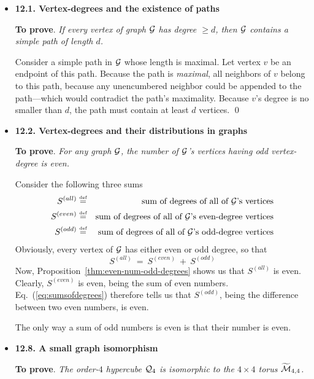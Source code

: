 \begin{itemize}
\item
{\bf 12.1. Vertex-degrees and the existence of paths}
\smallskip

{\bf To prove}. {\em If every vertex of graph $\mbox{$\cal G$}$ has degree $\geq d$, then $\mbox{$\cal G$}$ contains a {\em simple} path of length $d$.}
\smallskip

Consider a simple path in $\mbox{$\cal G$}$ whose length is maximal.  Let vertex $v$ be an endpoint of this path.  Because the path is {\em maximal}, all neighbors of $v$ belong to this path, because any unencumbered neighbor could be appended to the path---which would contradict the path's maximality.  Because $v$'s degree is no smaller than $d$, the path must contain at least $d$ vertices.  \qed

\medskip\item
{\bf 12.2. Vertex-degrees and their distributions in graphs}
\smallskip

{\bf To prove}.  {\em For any graph $\mbox{$\cal G$}$, the number of $\mbox{$\cal G$}$'s vertices having odd vertex-degree is even.}

\smallskip

Consider the following three sums
\begin{eqnarray*}
S^{(all)}     & \stackrel{\mbox{{\tiny def}}}{=} & \mbox{sum of degrees of all of $\mbox{$\cal G$}$'s vertices} \\
S^{(even)} & \stackrel{\mbox{{\tiny def}}}{=} & \mbox{sum of degrees of all of $\mbox{$\cal G$}$'s even-degree vertices} \\
S^{(odd)}  & \stackrel{\mbox{{\tiny def}}}{=} & \mbox{sum of degrees of all of $\mbox{$\cal G$}$'s odd-degree vertices}
\end{eqnarray*}
Obviously, every vertex of $\mbox{$\cal G$}$ has either even or odd degree, so that
\begin{equation}
\label{eq:sumsofdegrees}
S^{(all)} \ = \ S^{(even)} \ + \ S^{(odd)}
\end{equation} 
Now, Proposition~\ref{thm:even-num-odd-degrees} shows us that $S^{(all)}$ is even.  Clearly, $S^{(even)}$ is even, being the sum of even numbers.  Eq.~(\ref{eq:sumsofdegrees}) therefore tells us that $S^{(odd)}$, being the difference between two even numbers, is even.

The only way a sum of odd numbers is even is that their number is even.


\medskip\item
{\bf 12.8. A small graph isomorphism}
\smallskip

{\bf To prove}.  {\em The order-$4$ hypercube $\mbox{$\cal Q$}_4$ is \textit{isomorphic} to the $4 \times 4$ torus $\widetilde{\mbox{$\cal M$}}_{4,4}$.}
\medskip


\end{itemize}
